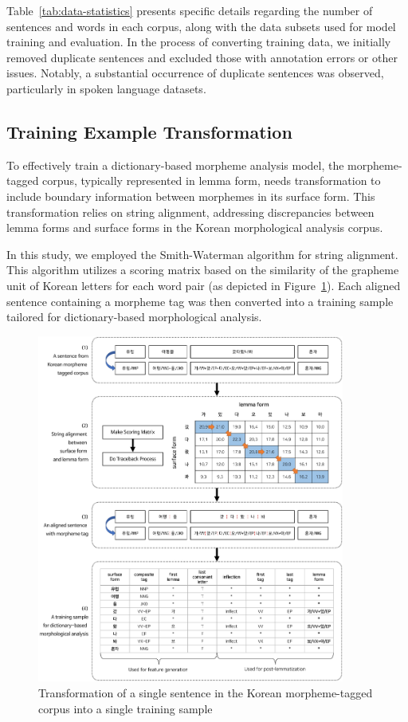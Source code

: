 \documentclass[AMS,STIX2COL]{WileyNJD-v2}
\begin{document}
    Table~\ref{tab:data-statistics} presents specific details regarding the number of sentences and words in each corpus, along with the data subsets used for model training and evaluation.
    In the process of converting training data, we initially removed duplicate sentences and excluded those with annotation errors or other issues.
    Notably, a substantial occurrence of duplicate sentences was observed, particularly in spoken language datasets.

    \subsection{Training Example Transformation}\label{subsec:training-example-transformation}

    To effectively train a dictionary-based morpheme analysis model, the morpheme-tagged corpus, typically represented in lemma form, needs transformation to include boundary information between morphemes in its surface form.
    This transformation relies on string alignment, addressing discrepancies between lemma forms and surface forms in the Korean morphological analysis corpus.

    In this study, we employed the Smith-Waterman algorithm for string alignment.
    This algorithm utilizes a scoring matrix based on the similarity of the grapheme unit of Korean letters for each word pair (as depicted in Figure~\ref{fig:sample}).
    Each aligned sentence containing a morpheme tag was then converted into a training sample tailored for dictionary-based morphological analysis.

    \begin{figure}[h]
        \centerline{\includegraphics[width=0.9\textwidth]{fig;sample-v3}}
        \caption{Transformation of a single sentence in the Korean morpheme-tagged corpus into a single training sample}
        \label{fig:sample}
    \end{figure}
\end{document}
